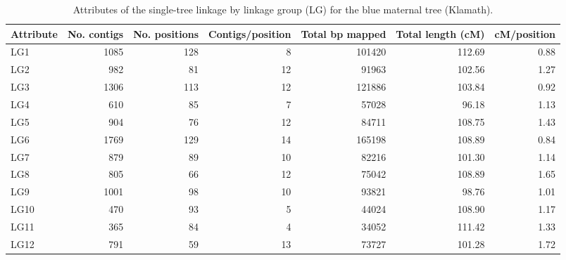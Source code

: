\documentclass[smallextended]{svjour3}
\begin{document}
\clearpage
\begin{landscape}
\begin{table}[ht]
  \caption{Attributes of the single-tree linkage by linkage group (LG) for the blue maternal tree (Klamath).} 
\begin{tabular}{lrrrrrr}
  \toprule
  Attribute & No. contigs & No. positions & Contigs/position & Total bp mapped & Total length (cM) & cM/position \\
  \midrule
  LG1 & 1085 & 128 & 8 & \num{101420} & 112.69 & 0.88 \\
  LG2 & 982 & 81 & 12 & \num{91963} & 102.56 & 1.27 \\
  LG3 & 1306 & 113 & 12 & \num{121886} & 103.84 & 0.92 \\
  LG4 & 610 & 85 & 7 & \num{57028} & 96.18 & 1.13 \\
  LG5 & 904 & 76 & 12 & \num{84711} & 108.75 & 1.43 \\
  LG6 & 1769 & 129 & 14 & \num{165198} & 108.89 & 0.84 \\
  LG7 & 879 & 89 & 10 & \num{82216} & 101.30 & 1.14 \\
  LG8 & 805 & 66 & 12 & \num{75042} & 108.89 & 1.65 \\
  LG9 & 1001 & 98 & 10 & \num{93821} & 98.76 & 1.01 \\
  LG10 & 470 & 93 & 5 & \num{44024} & 108.90 & 1.17 \\
  LG11 & 365 & 84 & 4 & \num{34052} & 111.42 & 1.33 \\
  LG12 & 791 & 59 & 13 & \num{73727} & 101.28 & 1.72 \\
  \bottomrule
\end{tabular}
\label{t:label}
\end{table}
\end{landscape}
\end{document}
